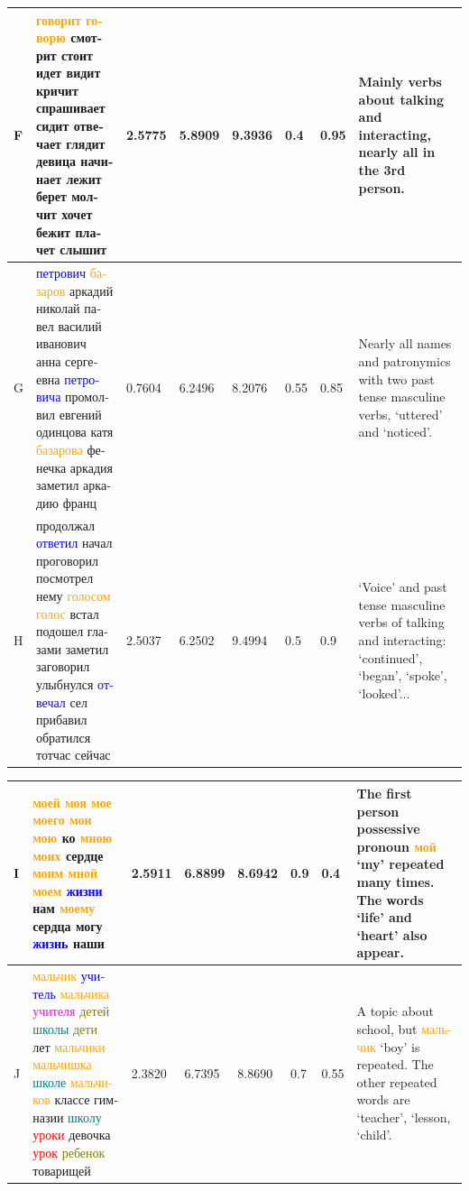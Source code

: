 \documentclass[11pt,a4paper]{article}
\begin{document}
\begin{landscape}
\begin{center}
\begin{tabularx}{\textwidth}{|l|X|l|l|l|l|l|X|}
    F & \foreignlanguage{russian}{\textcolor{orange}{говорит говорю} смотрит стоит идет видит кричит спрашивает сидит отвечает глядит девица начинает лежит берет молчит хочет бежит плачет слышит} & 2.5775 & 5.8909 & 9.3936 & 0.4 & 0.95 & Mainly verbs about talking and interacting, nearly all in the 3rd person. \\ \hline
    G & \foreignlanguage{russian}{\textcolor{blue}{петрович} \textcolor{orange}{базаров} аркадий николай павел василий иванович анна сергеевна \textcolor{blue}{петровича} промолвил евгений одинцова катя \textcolor{orange}{базарова} фенечка аркадия заметил аркадию франц} & 0.7604 & 6.2496 & 8.2076 & 0.55 & 0.85 & Nearly all names and patronymics with two past tense masculine verbs, `uttered' and `noticed'. \\ \hline
    H & \foreignlanguage{russian}{продолжал \textcolor{blue}{ответил} начал проговорил посмотрел нему \textcolor{orange}{голосом голос} встал подошел глазами заметил заговорил улыбнулся \textcolor{blue}{отвечал} сел прибавил обратился тотчас сейчас} & 2.5037 & 6.2502 & 9.4994 & 0.5 & 0.9 & `Voice' and past tense masculine verbs of talking and interacting: `continued', `began', `spoke', `looked'... \\ \hline
    \end{tabularx}

\end{center}
\begin{center}
\begin{tabularx}{\textwidth}{|l|X|l|l|l|l|l|X|}\hline
    I & \foreignlanguage{russian}{\textcolor{orange}{моей моя мое моего мои мою} ко \textcolor{orange}{мною моих} сердце \textcolor{orange}{моим мной моем} \textcolor{blue}{жизни} нам \textcolor{orange}{моему} сердца могу \textcolor{blue}{жизнь} наши} & 2.5911 & 6.8899 & 8.6942 & 0.9 & 0.4 & The first person possessive pronoun \foreignlanguage{russian}{\textcolor{orange}{мой}} `my' repeated many times. The words `life' and `heart' also appear.  \\ \hline
    J & \foreignlanguage{russian}{\textcolor{orange}{мальчик} \textcolor{blue}{учитель} \textcolor{orange}{мальчика} \textcolor{magenta}{учителя} \textcolor{olive}{детей} \textcolor{teal}{школы} \textcolor{olive}{дети} лет \textcolor{orange}{мальчики мальчишка} \textcolor{teal}{школе} \textcolor{orange}{мальчиков} классе гимназии \textcolor{teal}{школу} \textcolor{red}{уроки} девочка \textcolor{red}{урок} \textcolor{olive}{ребенок} товарищей} & 2.3820 & 6.7395 & 8.8690 & 0.7 & 0.55 & A topic about school, but \foreignlanguage{russian}{\textcolor{orange}{мальчик}} `boy' is repeated. The other repeated words are `teacher', `lesson, `child'. \\ \hline
\end{tabularx}
\end{center}



\end{landscape}
\end{document}

